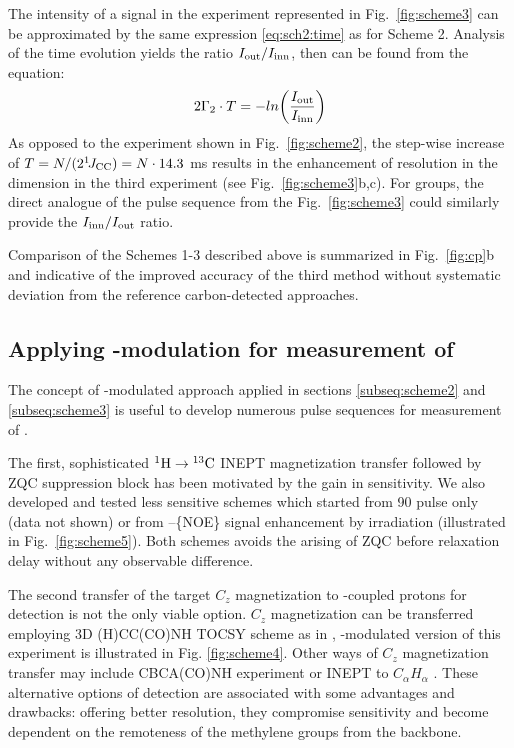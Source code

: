 \documentclass[twocolumn]{svjour3}           %
\begin{document}
The intensity of a signal in the experiment represented in 
Fig.~\ref{fig:scheme3} can be approximated by the same expression 
\eqref{eq:sch2:time} as for Scheme 2.
Analysis of the time evolution yields the ratio $I_\textrm{out}/I_\textrm{inn}$, then \gtwoCH{} can be found from the 
equation:
\begin{equation}
\label{eq:sch3:intensity}
 2 \Gamma_2 \cdot T = -ln \biggl(\frac{I_\textrm{out}}{I_\textrm{inn}} \biggr) 
\end{equation}
As opposed to the experiment shown in Fig.~\ref{fig:scheme2}, 
the step-wise increase of 
$T = N/(2 ^1\!J_{\text{CC}}) = N \cdot 14.3$ ms results in the enhancement of resolution 
in the \clab{} dimension in the third experiment (see 
Fig.~\ref{fig:scheme3}b,c). 
For \labNHtwo{} groups, the direct \nlab{} analogue of the pulse sequence
from the Fig.~\ref{fig:scheme3} could similarly provide the $I_\textrm{inn}/I_\textrm{out}$ ratio. 

Comparison of the Schemes 1-3 described above is summarized in
Fig.~\ref{fig:cp}b and indicative of the improved accuracy of the third 
method without systematic deviation from the reference carbon-detected
approaches.

\subsection{Applying \oneJch-modulation for measurement of \gtwo{}}
\label{subseq:gtwoblock}

The concept of \oneJch-mo\-du\-la\-ted approach applied in sections
\ref{subseq:scheme2} and \ref{subseq:scheme3} is useful to develop numerous pulse sequences for measurement of \gtwoCH{}.

The first, sophisticated ${}^{1}\text{H} \rightarrow{} {}^{13}\text{C}$ INEPT magnetization 
transfer followed by {ZQC} suppression block has been motivated by the gain in sensitivity. We also developed and tested less 
sensitive schemes which started from 90\degree{} \clab{} pulse only (data not shown) or from \hlab--\clab \{NOE\} signal enhancement by \hlab{} irradiation (illustrated in Fig.~\ref{fig:scheme5}). Both schemes avoids the arising of {ZQC} before \gtwo{} relaxation delay without any observable difference.

The second transfer of the target $C_z$ magnetization to \oneJch-coupled
protons for detection is not the only viable
option. $C_z$ magnetization can be transferred employing 
3D {(H)CC(CO)NH} {TOCSY} sche\-me as in \cite{zheng_measurement_2004}, \oneJch-modulated version of this experiment is illustrated in Fig. \ref{fig:scheme4}.
Other ways of $C_z$ magnetization transfer may include  CBCA(CO)NH
experiment \cite{yang_1h13c_1999,yang_study_1998} or {INEPT}
to $C_\alpha H_\alpha$ \cite{banci_side_2001}. These
alternative options of detection are associated with some advantages and
drawbacks: offering better resolution, they compromise sensitivity and
become dependent on the remoteness of the methylene groups from the
backbone. 
\end{document}
